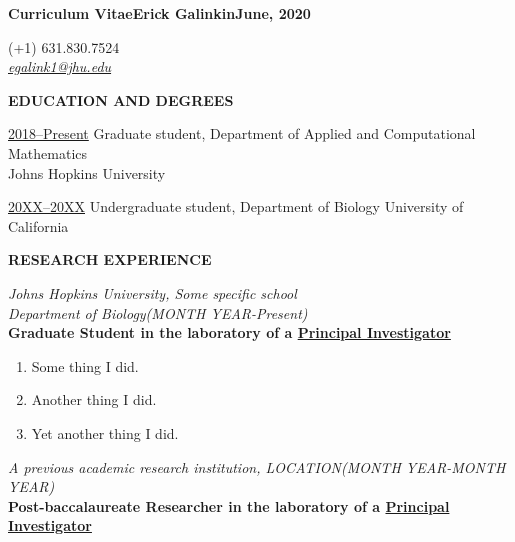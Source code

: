 



\setlength{\parindent}{0pt}

\setlength{\parskip}{6pt}

\frenchspacing

\footnotesize

\textbf{\small Curriculum Vitae\hfill\large Erick Galinkin\hfill\small June, 2020}
\begin{center}
(+1) 631.830.7524\\
{\color{blue} \ul{\sffamily\textit{egalink1@jhu.edu}}}
\end{center}

\sffamily

\textbf{EDUCATION AND DEGREES}

\ul{2018--Present} Graduate student,
Department of Applied and Computational Mathematics\\
Johns Hopkins University

\ul{20XX--20XX} Undergraduate student,
Department of Biology
University of California


\textbf{RESEARCH EXPERIENCE}

\textit{Johns Hopkins University, Some specific school}\\
\textit{Department of Biology\hfill(MONTH YEAR-Present)}\\
\textbf{\rmfamily Graduate Student in the laboratory of a \ul{Principal Investigator}}

\begin{enumerate}
\item Some thing I did.
\item Another thing I did.
\item Yet another thing I did.
\end{enumerate}

\textit{A previous academic research institution, LOCATION\hfill(MONTH YEAR-MONTH YEAR)}\\
\textbf{\rmfamily Post-baccalaureate Researcher in the laboratory of a \ul{Principal Investigator}}

